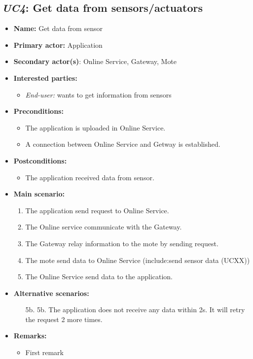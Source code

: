 \subsection{\emph{UC4}: Get data from sensors/actuators}
\begin{itemize}
    \item \textbf{Name:} Get data from sensor
    \item \textbf{Primary actor:} Application
    \item \textbf{Secondary actor(s)}: Online Service, Gateway, Mote
    \item \textbf{Interested parties:}
        \begin{itemize}
            \item \textit{End-user:} wants to get information from sensors
        \end{itemize}

    \item \textbf{Preconditions:}
        \begin{itemize}
            \item The application is uploaded in Online Service.
            \item A connection between Online Service and Getway is established.
        \end{itemize}

    \item \textbf{Postconditions:}
        \begin{itemize}
            \item The application received data from sensor.
        \end{itemize}

    \item \textbf{Main scenario:}
    \begin{enumerate}
       \item The application send request to Online Service.
       \item The Online service communicate with the Gateway.
       \item The Gateway relay information to the mote by sending request.
       \item The mote send data to Online Service (include:send sensor data (UCXX))
       \item The Online Service send data to the application.
    \end{enumerate}

    \item \textbf{Alternative scenarios:}
    \begin{enumerate}
        \item [5b.] 5b. The application does not receive any data within 2s.
                    It will retry the request 2 more times.
    \end{enumerate}

    \item \textbf{Remarks:}
        \begin{itemize}
            \item First remark
        \end{itemize}
\end{itemize}

